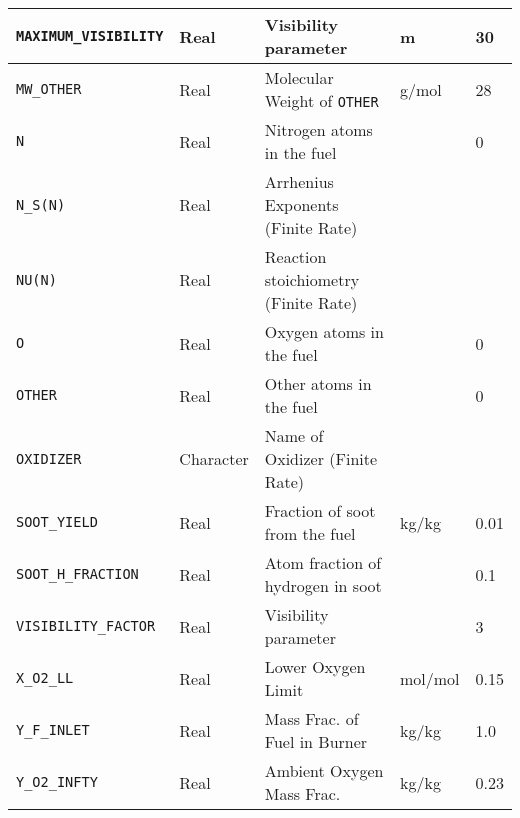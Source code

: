 \documentclass[11pt]{book}
\newcommand{\ct}{\tt\small}
\begin{document}
\begin{table}[H]
\begin{tabular*}{\textwidth}{@{\extracolsep{\fill}}|l|l|l|l|l|}
{\ct MAXIMUM\_VISIBILITY}                 & Real        & Visibility parameter                      &  m                &     30   \\ \hline
{\ct MW\_OTHER}                           & Real        & Molecular Weight of {\ct OTHER}           &  g/mol            & 28      \\ \hline
{\ct N}                                   & Real        & Nitrogen atoms in the fuel                &                   & 0    \\ \hline
{\ct N\_S(N)}                             & Real        & Arrhenius Exponents (Finite Rate)         &                   &     \\ \hline
{\ct NU(N)}                               & Real        & Reaction stoichiometry (Finite Rate)      &                   &     \\ \hline
{\ct O}                                   & Real        & Oxygen atoms in the fuel                  &                   & 0    \\ \hline
{\ct OTHER}                               & Real        & Other atoms in the fuel                   &                   & 0    \\ \hline
{\ct OXIDIZER}                            & Character   & Name of Oxidizer (Finite Rate)            &                   &         \\ \hline
{\ct SOOT\_YIELD}                         & Real        & Fraction of soot from the fuel            & kg/kg             & 0.01    \\ \hline
{\ct SOOT\_H\_FRACTION}                   & Real        & Atom fraction of hydrogen in soot         &                   & 0.1    \\ \hline
{\ct VISIBILITY\_FACTOR}                  & Real        & Visibility parameter                      &                   &     3   \\ \hline
{\ct X\_O2\_LL}                           & Real        & Lower Oxygen Limit                        &  mol/mol          & 0.15    \\ \hline
{\ct Y\_F\_INLET}                         & Real        & Mass Frac. of Fuel in Burner              &  kg/kg            & 1.0     \\ \hline
{\ct Y\_O2\_INFTY}                        & Real        & Ambient Oxygen Mass Frac.                 &  kg/kg            & 0.23    \\ \hline
\end{tabular*}
\end{table}
\end{document}
